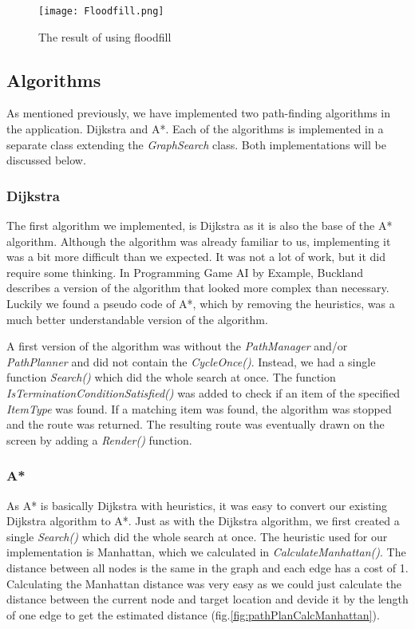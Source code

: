 \begin{figure}[h!]
    \begin{center}
        \texttt{[image: Floodfill.png]}
    \end{center}
    \caption{The result of using floodfill}
    \label{fig:pathPlanFloodfill}
\end{figure}

\subsection{Algorithms}\label{subsec:pathalgorithms}
As mentioned previously, we have implemented two path-finding algorithms in the application.
Dijkstra and A*. Each of the algorithms is implemented in a separate class extending the \textit{GraphSearch} class.
Both implementations will be discussed below.

\subsubsection{Dijkstra}\label{sec:pathDijkstra}
The first algorithm we implemented, is Dijkstra as it is also the base of the A* algorithm.
Although the algorithm was already familiar to us, implementing it was a bit more difficult than we expected.
It was not a lot of work, but it did require some thinking.
In Programming Game AI by Example, Buckland describes a version of the algorithm that looked more complex than necessary.
Luckily we found a pseudo code\cite{aapc} of A*, which by removing the heuristics, was a much better understandable version of the algorithm.\par
A first version of the algorithm was without the \textit{PathManager} and/or \textit{PathPlanner} and did not contain the \textit{CycleOnce()}.
Instead, we had a single function \textit{Search()} which did the whole search at once.
The function \textit{IsTerminationConditionSatisfied()} was added to check if an item of the specified \textit{ItemType} was found.
If a matching item was found, the algorithm was stopped and the route was returned.
The resulting route was eventually drawn on the screen by adding a \textit{Render()} function.

\subsubsection{A*}\label{sec:pathAstar}
As A* is basically Dijkstra with heuristics, it was easy to convert our existing Dijkstra algorithm to A*.
Just as with the Dijkstra algorithm, we first created a single \textit{Search()} which did the whole search at once.
The heuristic used for our implementation is Manhattan, which we calculated in \textit{CalculateManhattan()}.
The distance between all nodes is the same in the graph and each edge has a cost of 1.
Calculating the Manhattan distance was very easy as we could just calculate the distance between the current node and target location
and devide it by the length of one edge to get the estimated distance (fig.\ref{fig:pathPlanCalcManhattan}).

